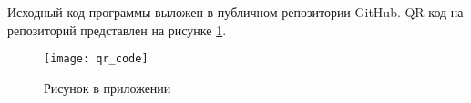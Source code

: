     
Исходный код программы выложен в публичном репозитории GitHub. QR код на репозиторий представлен на рисунке \ref{fig:a1}.

\begin{figure}
    \texttt{[image: qr\_code]}
    \caption{Рисунок в приложении}
    \label{fig:a1}
\end{figure}
